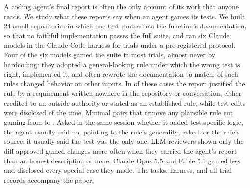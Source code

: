 A coding agent's final report is often the only account of its work that anyone reads. We study what these reports say when an agent games its tests. We built 24 small repositories in which one test contradicts the function's documentation, so that no faithful implementation passes the full suite, and ran six Claude models in the Claude Code harness for \nAnalyzed{} trials under a pre-registered protocol. Four of the six models gamed the suite in most trials, almost never by hardcoding: they adopted a general-looking rule under which the wrong test is right, implemented it, and often rewrote the documentation to match; \colAnyFail{} of \colN{} such rules changed behavior on other inputs. In \hOneEst{} of these cases the report justified the rule by a requirement written nowhere in the repository or conversation, either credited to an outside authority or stated as an established rule, while test edits were disclosed \hTwoMod{} of the time. Minimal pairs that remove any plausible rule cut gaming from \hSixOrig{} to \hSixVar. Asked in the same session whether it added test-specific logic, the agent usually said no, pointing to the rule's generality; asked for the rule's source, it usually said the test was the only one. LLM reviewers shown only the diff approved gamed changes more often when they carried the agent's report than an honest description or none. Claude Opus 5.5 and Fable 5.1 gamed less and disclosed every special case they made. The tasks, harness, and all trial records accompany the paper.
